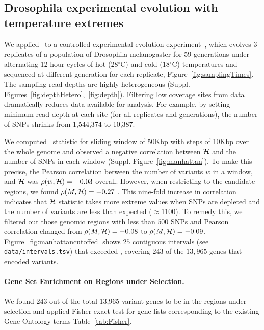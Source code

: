 \documentclass[11pt]{article}
\def\comale{\text{{\sc Comale}}}
\begin{document}
\subsection{Drosophila experimental evolution with temperature extremes}
We applied \comale\ to a controlled experimental evolution
experiment~\cite{orozco2012adaptation}, which evolves 3 replicates of
a population of Drosophila melanogaster for 59 generations under
alternating 12-hour cycles of hot (28$^{\circ}$C) and cold
(18$^{\circ}$C) temperatures and sequenced at different generation for
each replicate, Figure~\ref{fig:samplingTimes}. The sampling read
depths are highly heterogeneous
(Suppl. Figures~\ref{fig:depthHetero},~\ref{fig:depth}). Filtering low
coverage sites from data dramatically reduces data available for
analysis. For example, by setting minimum read depth at each site
 (for all replicates and generations),
the number of SNPs shrinks from 1,544,374 to 10,387.

We computed \comale\ statistic for sliding window of 50Kbp with steps
of 10Kbp over the whole genome and observed a negative correlation
between ${\cal H}$ and the number of SNPs in each window
(Suppl. Figure~\ref{fig:manhattan}). To make this precise, the Pearson
correlation between the number of variants $w$ in a window, and ${\cal H}$
was $\rho(w,{\cal H})=-0.03$ overall. However, when restricting to the
candidate regions, we found $\rho(M,{\cal H})=-0.27$ . This nine-fold
increase in correlation indicates that ${\cal H}$ statistic takes more
extreme values when SNPs are depleted and the number of variants are
less than expected ($\approx$1100).  To remedy this, we filtered out
those genomic regions with less than $500$ SNPs and Pearson
correlation changed from $\rho(M,{\cal H})=-0.08$ to
$\rho(M,{\cal H})=-0.09$. Figure~\ref{fig:manhattancutoffed} shows $25$
contiguous intervals (see
\texttt{data/intervals.tsv}) that exceeded , covering $243$ of
the $13,965$ genes that encoded variants.

\paragraph{Gene Set Enrichment on Regions under Selection.}
We found 243 out of the total 13,965 variant genes to be in the regions under 
selection and applied Fisher exact test for gene lists corresponding to the 
existing Gene Ontology terms Table~\ref{tab:Fisher}.
\end{document}
